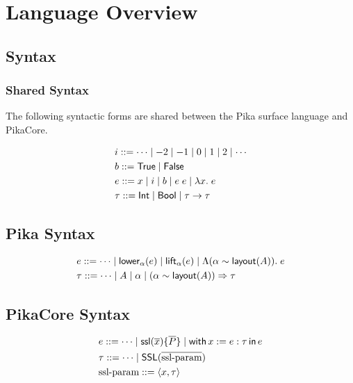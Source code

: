 \section{Language Overview}

\subsection{Syntax}

\subsubsection{Shared Syntax}

The following syntactic forms are shared between the Pika surface language and PikaCore.

\begin{align*}
  &i ::= \cdots \mid -2 \mid -1 \mid 0 \mid 1 \mid 2 \mid \cdots
  \\
  &b ::= \textsf{True}{} \mid \textsf{False}
  \\
  &e ::= x \mid i \mid b \mid e\; e \mid \lambda x.\; e
  \\
  &\tau ::= \textsf{Int} \mid \textsf{Bool} \mid \tau \rightarrow \tau
\end{align*}

\subsection{Pika Syntax}
\begin{align*}
  &e ::= \cdots \mid \textsf{lower}_{\alpha}(e) \mid \textsf{lift}_{\alpha}(e) \mid \Lambda (\alpha \sim \textsf{layout}(A)).\; e
  \\
  &\tau ::= \cdots \mid A \mid \alpha \mid (\alpha \sim \textsf{layout}(A)) \Rightarrow \tau
\end{align*}

\subsection{PikaCore Syntax}
\begin{align*}
  &e ::= \cdots \mid \textsf{ssl}(\overline{x}) \{ \overline{P} \} \mid \textsf{with}\,x := e : \tau\,\textsf{in}\, e
  \\
  &\tau ::= \cdots \mid \textsf{SSL}(\overline{\textnormal{ssl-param}})
  \\
  &\textnormal{ssl-param} ::= \langle x, \tau \rangle
\end{align*}

